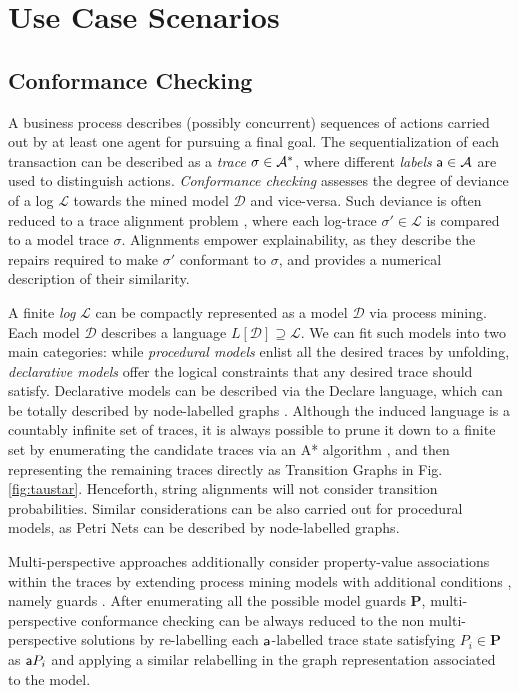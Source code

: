 \section{Use Case Scenarios}
\subsection{Conformance Checking}
A business process describes (possibly concurrent) sequences of actions carried out by at least one agent for pursuing a final goal. The sequentialization of each transaction can be described as a \textit{trace} $\sigma\in\mathcal{A}^*$, where different \textit{labels} $\mathsf{a}\in\mathcal{A}$ are used to distinguish actions. 
\textit{Conformance checking} assesses the degree of deviance of a log $\mathcal{L}$ towards the mined model $\mathcal{D}$ and vice-versa. Such deviance is often reduced to a  trace alignment problem \cite{DBLP:conf/edoc/AdriansyahDA11}, where each log-trace $\sigma'\in\mathcal{L}$ is compared to a model trace $\sigma$. Alignments empower explainability, as they describe the repairs required to make $\sigma'$ conformant to $\sigma$, and provides a numerical description of  their similarity.  

A finite \textit{log} $\mathcal{L}$ can be compactly represented as a model $\mathcal{D}$ via process  mining. Each model $\mathcal{D}$ describes a language $L[\mathcal{D}]\supseteq\mathcal{L}$. We can fit such models into two main categories: while \textit{procedural models} \cite{DBLP:journals/tosem/PolyvyanyySWCM20} %
 enlist all the desired traces by unfolding,  \textit{declarative models} \cite{BurattinMAS12} offer the logical constraints that any desired trace should satisfy. Declarative models can be described via the Declare language, which can be totally described by node-labelled graphs \cite{GiacomoMM14}. Although the induced language is a countably infinite set of traces, it is always possible to prune it down to a finite set  by enumerating the candidate traces via an A* algorithm \cite{LeoniMA12}, and then representing the remaining traces directly as Transition Graphs in Fig. \ref{fig:taustar}. Henceforth, string alignments will not consider transition probabilities. Similar considerations can be also carried out for procedural models, as Petri Nets can be described by node-labelled graphs. %
 
Multi-perspective approaches additionally consider property-value associations within the traces by extending process mining models with additional conditions \cite{GiacomoMGMM14}, namely guards \cite{MannhardtLRA16}. After enumerating all the possible model guards  $\mathbf{P}$, multi-perspective conformance checking can be always reduced to the non multi-perspective solutions by  re-labelling each $\mathsf{a}$-labelled trace state satisfying  $P_i\in\mathbf{P}$ as $\mathsf{a}{P_i}$ and applying a similar relabelling in the graph representation associated to the model.

